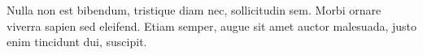 \documentclass[12pt,twoside,openright,a5paper]{book}
\begin{document}
Nulla non est bibendum, tristique diam nec, sollicitudin sem. Morbi ornare viverra sapien sed eleifend. Etiam semper, augue sit amet auctor malesuada, justo enim tincidunt dui, suscipit.



%



%















%




\end{document}
